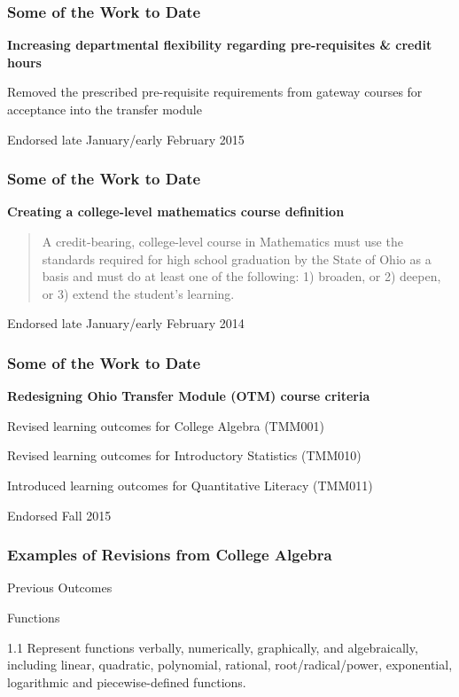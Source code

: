 \documentclass[13pt]{beamer}
\newcounter{a}
\newcounter{b}
\begin{document}
\begin{frame}
  \frametitle{Some of the Work to Date}

  \textbf{Increasing departmental flexibility regarding pre-requisites
    \& credit hours}

Removed the prescribed pre-requisite requirements from gateway courses
for acceptance into the transfer module

Endorsed late January/early February 2015
\end{frame}

\begin{frame}
  \frametitle{Some of the Work to Date}

  \textbf{Creating a college-level mathematics course definition}

  \begin{quote}
A credit-bearing, college-level course in Mathematics must use the standards required for high school graduation by the State of Ohio as a basis and must do at least one of the following:  1) broaden, or 2) deepen, or 3) extend the student’s learning.\end{quote}

Endorsed late January/early February 2014
\end{frame}

\begin{frame}
  \frametitle{Some of the Work to Date}
  
  \textbf{Redesigning Ohio Transfer Module (OTM) course criteria}

Revised learning outcomes for College Algebra (TMM001) 


Revised learning outcomes for Introductory Statistics (TMM010)

Introduced learning outcomes for Quantitative Literacy (TMM011)

Endorsed Fall 2015
  
\end{frame}

\begin{frame}
  \frametitle{Examples of Revisions from College Algebra}

  Previous Outcomes

Functions

1.1 Represent functions verbally, numerically, graphically, and algebraically, including linear, quadratic, polynomial, rational, root/radical/power, exponential, logarithmic and piecewise-defined functions.
\end{frame}
\end{document}
